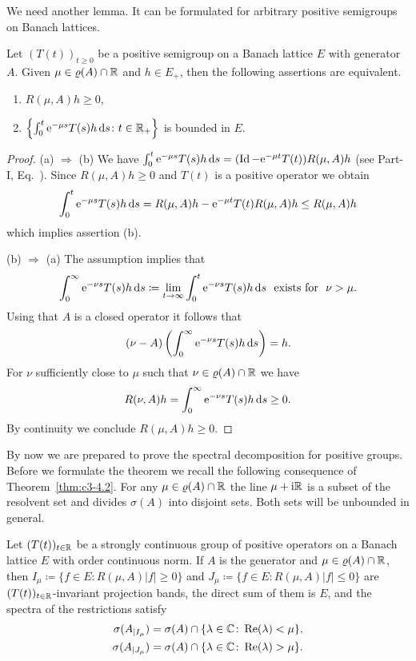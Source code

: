 We need another lemma. It can be formulated for arbitrary positive
semigroups on Banach lattices.
\begin{lemma}\label{lem:c3-4.7}
Let $(T(t))_{t \geq 0}$ be a positive semigroup on a Banach
lattice $E$ with generator $A$. Given $\mu \in \rho(A) \cap \R $ and $h \in E_+$, then the following assertions are equivalent.
\begin{enumerate}[\upshape (a)]
	\item 
	$R(\mu,A)h \geq 0$, 

	\item 
	$\left\{\int_{0}^{t} \mathrm{e}^{-\mu s}T(s)h \mathop{}\!\mathrm{d}{s} \colon t \in \mathbb{R} _+\right\}$ is bounded in $E$.
\end{enumerate}
\end{lemma}
\begin{proof}
(a) $\Rightarrow$ (b)  We have
$\int_{0}^{t} \mathrm{e}^{-\mu s}T(s)h \mathop{}\!\mathrm{d}{s} = (\operatorname{Id} - \mathrm{e}^{-\mu t}T(t))R(\mu,A)h$ 
(see Part-I, Eq.~).
%
Since $R(\mu,A)h \geq 0$ and $T(t)$ is a positive operator we obtain
\[%
\int_{0}^{t} \eu^{-\mu s}T(s)h \ds = R(\mu,A)h - \eu^{-\mu t}T(t)R(\mu,A)h \leq R(\mu,A)h
\] 
which implies assertion (b).

(b) $\Rightarrow$ (a)  The assumption implies that 
\[%
\int_{0}^{\infty} \eu^{-\nu s}T(s)h \ds \coloneq 
\lim_{t \to \infty} \int_{0}^{t} \eu^{-\nu s}T(s)h \ds \ \text{ exists for } \ \nu > \mu . 
\]
Using that $A$ is a closed operator it follows that 
\[%
(\nu - A)\left(\int_{0}^{\infty} \eu^{-\nu s}T(s)h \ds\right) = h .
\]
For $\nu$
sufficiently close to $\mu$ such that $\nu \in \rho(A) \cap \R $ we have 
\[%
R(\nu,A)h = \int_{0}^{\infty} \eu^{-\nu s}T(s)h \ds \geq 0 . 
\] 
By continuity we conclude $R(\mu,A)h \geq 0$.
\end{proof}
By now we are prepared to prove the spectral decomposition for positive groups. Before we formulate the theorem we recall the following
consequence of Theorem~\ref{thm:c3-4.2}. For any $\mu \in \rho(A) \cap \R $ the line $\mu+\mathrm{i}\mathbb{R} $ is a
subset of the resolvent set and divides $\sigma(A)$ into disjoint sets.
Both sets will be unbounded in general.
\begin{theorem} \label{thm:c3-4.8}
Let $(T(t))_{t \in \mathbb{R} }$ be a strongly continuous group of positive
operators on a Banach lattice $E$ with order continuous norm.
If\/ $A$ is the generator and $\mu \in \rho(A) \cap \R $, then
$I_{\mu} \coloneq  \{f \in E \colon R(\mu,A)|f| \geq 0\}$ and $J_{\mu} \coloneq  \{f \in E \colon R(\mu,A)|f| \leq 0\}$
are $(T(t))_{t \in \mathbb{R} }$-invariant projection bands, 
the direct sum of them is $E$, and the spectra of the restrictions satisfy
\begin{align*}
	\sigma(A_{|I_{\mu}}) &= \sigma(A) \cap \{\lambda \in \mathbb{C}  \colon \mathop{}\!\mathrm{Re}(\lambda) < \mu\} ,\\
	\sigma(A_{|J_{\mu}}) &= \sigma(A) \cap \{\lambda \in \mathbb{C}  \colon \mathop{}\!\mathrm{Re}(\lambda) > \mu\} .
\end{align*}
\end{theorem}
